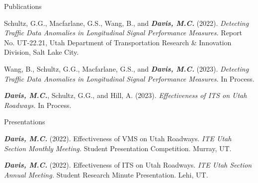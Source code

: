 \documentclass{resume} %
\begin{document}
\begin{rSection}{Publications}

Schultz, G.G., Macfarlane, G.S., Wang, B., and {\bf \em Davis, M.C.} (2022). {\em Detecting Traffic Data Anomalies in Longitudinal Signal Performance Measures.} Report No. UT-22.21, Utah Department of Transportation Research \& Innovation Division, Salt Lake City.

Wang, B., Schultz, G.G., Macfarlane, G.S., and {\bf \em Davis, M.C.} (2023). {\em Detecting Traffic Data Anomalies in Longitudinal Signal Performance Measures.} In Process.

{\bf \em Davis, M.C.}, Schultz, G.G., and Hill, A. (2023). {\em 
Effectiveness of ITS on Utah Roadways.} In Process.

\end{rSection}


% 
% 
% 
% 

\clearpage
\begin{rSection}{Presentations}

{\bf \em Davis, M.C.} (2022). {Effectiveness of VMS on Utah Roadways.} {\em ITE Utah Section Monthly Meeting.} Student Presentation Competition. Murray, UT.

{\bf \em Davis, M.C.} (2022). {Effectiveness of ITS on Utah Roadways.} {\em ITE Utah Section Annual Meeting.} Student Research Minute Presentation. Lehi, UT. 

\end{rSection}


\end{document}
